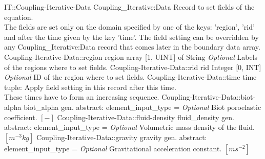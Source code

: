 \begin{RecordType}
	{IT::Coupling-Iterative-Data}
	{Coupling{\_}Iterative:Data}
	{}%
	{}%
	{{{Record to set fields of the equation.}\\{
The fields are set only on the domain specified by one of the keys: 'region', 'rid'}\\{
and after the time given by the key 'time'. The field setting can be overridden by}\\{
 any Coupling{\_}Iterative:Data record that comes later in the boundary data array.}%
}}
		\RecKey
			{Coupling-Iterative-Data::region}
			{region}
			{{array [1, UINT] of }{String}}{}
			{ \it{Optional}}
			{{{Labels of the regions where to set fields. }%
}}
		\RecKey
			{Coupling-Iterative-Data::rid}
			{rid}
			{{Integer [0, INT]}}{}
			{ \it{Optional}}
			{{{ID of the region where to set fields.}%
}}
		\RecKey
			{Coupling-Iterative-Data::time}
			{time}
			{{tuple: }}{}
			{ }
			{{{Apply field setting in this record after this time.}\\{
These times have to form an increasing sequence.}%
}}
		\RecKey
			{Coupling-Iterative-Data::biot-alpha}
			{biot{\_}alpha}
			{{gen. abstract: }}{{element{\_}input{\_}type}{ = }}
			{ \it{Optional}}
			{{{Biot poroelastic coefficient. }{$[-]$}%
}}
		\RecKey
			{Coupling-Iterative-Data::fluid-density}
			{fluid{\_}density}
			{{gen. abstract: }}{{element{\_}input{\_}type}{ = }}
			{ \it{Optional}}
			{{{Volumetric mass density of the fluid. }{$[m^{-3}kg]$}%
}}
		\RecKey
			{Coupling-Iterative-Data::gravity}
			{gravity}
			{{gen. abstract: }}{{element{\_}input{\_}type}{ = }}
			{ \it{Optional}}
			{{{Gravitational acceleration constant. }{$[ms^{-2}]$}%
}}
\end{RecordType}
